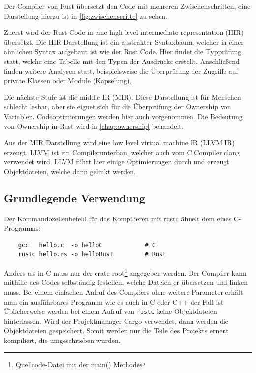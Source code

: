 Der Compiler von Rust übersetzt den Code mit mehreren Zwischenschritten, eine Darstellung hierzu ist in \autoref{fig:zwischenscritte} zu sehen. \cite{RustcDevelopment}

Zuerst wird der Rust Code in eine \glqq high level intermediate representation\grqq{} (HIR) übersetzt. Die HIR Darstellung ist ein abstrakter Syntaxbaum, welcher in einer ähnlichen Syntax aufgebaut ist wie der Rust Code. Hier findet die Typprüfung statt, welche eine Tabelle mit den Typen der Ausdrücke erstellt. Anschließend finden weitere Analysen statt, beispielsweise die Überprüfung der Zugriffe auf private Klassen oder Module (Kapselung).

Die nächste Stufe ist die \glqq middle IR\grqq{} (MIR). Diese Darstellung ist für Menschen schlecht lesbar, aber sie eignet sich für die Überprüfung der Ownership von Variablen. Codeoptimierungen werden hier auch vorgenommen. Die Bedeutung von Ownership in Rust wird in \autoref{chap:ownership} behandelt.

Aus der MIR Darstellung wird eine \glqq low level virtual machine IR\grqq{} (LLVM IR) erzeugt. LLVM ist ein Compilerunterbau, welcher auch vom C Compiler clang verwendet wird. LLVM führt hier einige Optimierungen durch und erzeugt Ob\-jektdateien, welche dann gelinkt werden.

\subsection{Grundlegende Verwendung}

Der Kommandozeilenbefehl für das Kompilieren mit rustc ähnelt dem eines C-Programms:

\begin{lstlisting}
    gcc   hello.c  -o helloC            # C
    rustc hello.rs -o helloRust         # Rust
\end{lstlisting}

Anders als in C muss nur der crate root\footnote{Quellcode-Datei mit der main() Methode} angegeben werden. Der Compiler kann mithilfe des Codes selbständig festellen, welche Dateien er übersetzen und linken muss. Bei einem einfachen Aufruf des Compilers ohne weitere Parameter erhält man ein ausführbares Programm wie es auch in C oder C++ der Fall ist. Üblicherweise werden bei einem Aufruf von \verb"rustc" keine Objektdateien hinterlassen. Wird der Projektmanager Cargo verwendet, dann werden die Objektdateien gespeichert. Somit werden nur die Teile des Projekts erneut kompiliert, die umgeschrieben wurden.

